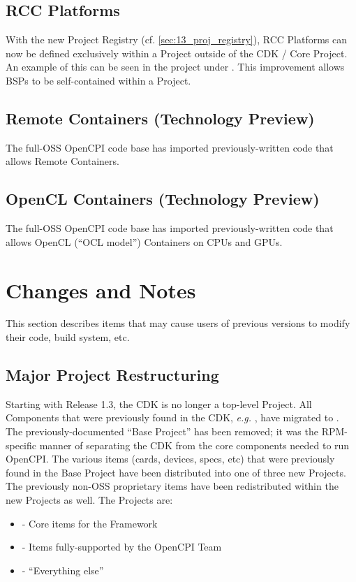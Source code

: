\subsection{RCC Platforms}
\label{sec:13_rcc_platforms}
With the new Project Registry (cf. \ref{sec:13_proj_registry}), RCC Platforms can now be defined exclusively within a Project outside of the CDK / Core Project. An example of this can be seen in the  project under . This improvement allows BSPs to be self-contained within a Project.

\subsection{Remote Containers (Technology Preview)}
The full-OSS OpenCPI code base has imported previously-written code that allows Remote Containers.

\subsection{OpenCL Containers (Technology Preview)}
The full-OSS OpenCPI code base has imported previously-written code that allows OpenCL (``OCL model'') Containers on CPUs and GPUs.

\section{Changes and Notes}
This section describes items that may cause users of previous versions to modify their code, build system, etc.

\subsection{Major Project Restructuring} %
\label{sec:13_restructure}
Starting with Release 1.3, the CDK is no longer a top-level Project. All Components that were previously found in the CDK, \textit{e.g.} , have migrated to . The previously-documented ``Base Project'' has been removed; it was the RPM-specific manner of separating the CDK from the core components needed to run OpenCPI. The various items (cards, devices, specs, etc) that were previously found in the Base Project have been distributed into one of three new Projects. The previously non-OSS proprietary items have been redistributed within the new Projects as well. The Projects are:
\begin{itemize}
\setlength\itemsep{0em} %
\item {} - Core items for the Framework
\item {} - Items fully-supported by the OpenCPI Team
\item {} - ``Everything else''
\end{itemize}

